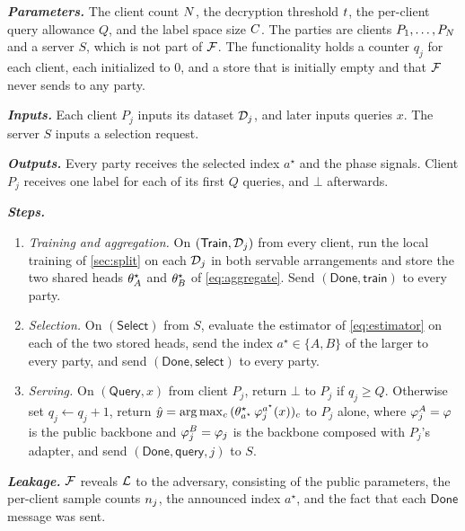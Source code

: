 \begin{functionality}[t]
\caption{HE-OFT $\Fhe$}
\label{func:ideal}
\footnotesize
\noindent\textbf{\emph{Parameters.}} The client count $N$, the decryption
threshold $t$, the per-client query allowance $Q$, and the label space size
$C$. The parties are clients $P_1,\dots,P_{N}$ and a server $S$, which is not
part of $\Fhe$. The functionality holds a
counter $q_j$ for each client, each initialized to $0$, and a store that is
initially empty and that $\Fhe$ never sends to any party.

\noindent\textbf{\emph{Inputs.}} Each client $P_j$ inputs its dataset $\mathcal{D}_j$, and
later inputs queries $x$. The server $S$ inputs a selection request.

\noindent\textbf{\emph{Outputs.}} Every party receives the selected index
$a^{\star}$ and the phase signals. Client $P_j$ receives one label for each of
its first $Q$ queries, and $\bot$ afterwards.

\noindent\textbf{\emph{Steps.}}
\begin{enumerate}\itemsep2pt \parskip0pt 
\item \emph{Training and aggregation.} On $(\mathsf{Train},\mathcal{D}_j)$ from every
  client, run the local training of \cref{sec:split} on each $\mathcal{D}_j$ in both
  servable arrangements and store the two shared heads $\theta^{\star}_{A}$ and
  $\theta^{\star}_{B}$ of \cref{eq:aggregate}. Send
  $(\mathsf{Done},\mathsf{train})$ to every party.
\item \emph{Selection.} On $(\mathsf{Select})$ from $S$, evaluate the estimator
  of \cref{eq:estimator} on each of the two stored heads, send the index
  $a^{\star}\in\{A,B\}$ of the larger to every party, and send
  $(\mathsf{Done},\mathsf{select})$ to every party.
\item \emph{Serving.} On $(\mathsf{Query},x)$ from client $P_j$, return $\bot$
  to $P_j$ if $q_j\ge Q$. Otherwise set $q_j\leftarrow q_j+1$, return
  $\hat y=\arg\max_c\,(\theta^{\star}_{a^{\star}}\,\varphi^{a^{\star}}_j(x))_c$ to
  $P_j$ alone, where $\varphi^{A}_j=\varphi$ is the public backbone and
  $\varphi^{B}_j=\varphi_j$ is the backbone composed with $P_j$'s adapter, and send
  $(\mathsf{Done},\mathsf{query},j)$ to $S$.
\end{enumerate}

\noindent\textbf{\emph{Leakage.}} $\Fhe$ reveals $\mathcal{L}$ to the adversary,
consisting of the public parameters, the per-client sample counts $n_j$, the
announced index $a^{\star}$, and the fact that each $\mathsf{Done}$ message was
sent.
\end{functionality}

